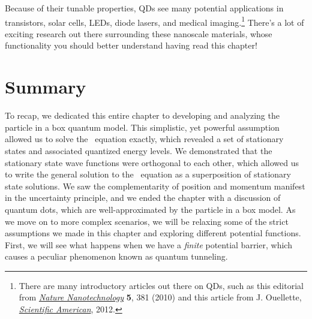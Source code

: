 Because of their tunable properties, QDs see many potential applications in transistors, solar cells, LEDs, diode lasers, and medical imaging.\footnote{There are many introductory articles out there on QDs, such as this editorial from \href{http://www.nature.com/nnano/journal/v5/n6/full/nnano.2010.127.html}{\emph{Nature Nanotechnology}} \textbf{5}, 381 (2010) and this article from J. Ouellette, \href{https://blogs.scientificamerican.com/cocktail-party-physics/quantum-dots-of-many-colors/}{\emph{Scientific American}}, 2012.} There's a lot of exciting research out there surrounding these nanoscale materials, whose functionality you should better understand having read this chapter!


\section{Summary}
To recap, we dedicated this entire chapter to developing and analyzing the particle in a box quantum model. This simplistic, yet powerful assumption allowed us to solve the \Sch\ equation exactly, which revealed a set of stationary states and associated quantized energy levels. We demonstrated that the stationary state wave functions were orthogonal to each other, which allowed us to write the general solution to the \Sch\ equation as a superposition of stationary state solutions. We saw the complementarity of position and momentum manifest in the uncertainty principle, and we ended the chapter with a discussion of quantum dots, which are well-approximated by the particle in a box model. As we move on to more complex scenarios, we will be relaxing some of the strict assumptions we made in this chapter and exploring different potential functions. First, we will see what happens when we have a \emph{finite} potential barrier, which causes a peculiar phenomenon known as quantum tunneling.


%